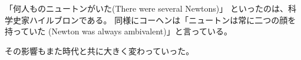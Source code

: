 \documentclass[12pt, uplatex]{jsarticle}
\begin{document}
「何人ものニュートンがいた(There were several Newtons)」
といったのは、科学史家ハイルブロンである。
同様にコーヘンは「ニュートンは常に二つの顔を持っていた
(Newton was always ambivalent)」と言っている。

その影響もまた時代と共に大きく変わっていった。
\end{document}
